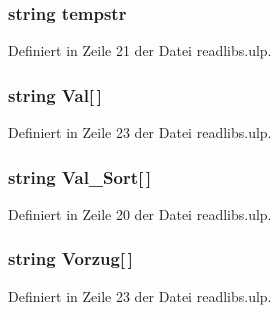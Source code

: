 \subsubsection[{tempstr}]{\setlength{\rightskip}{0pt plus 5cm}string tempstr}\label{readlibs_8ulp_a03ca86bb44d6d953219c512adb218dbb}


Definiert in Zeile 21 der Datei readlibs.\+ulp.

\hypertarget{readlibs_8ulp_a088204f20433deace071409889b5aba1}{}
\subsubsection[{Val}]{\setlength{\rightskip}{0pt plus 5cm}string Val\mbox{[}$\,$\mbox{]}}\label{readlibs_8ulp_a088204f20433deace071409889b5aba1}


Definiert in Zeile 23 der Datei readlibs.\+ulp.

\hypertarget{readlibs_8ulp_a08666752575cacdcfcc8699eb3c95022}{}
\subsubsection[{Val\+\_\+\+Sort}]{\setlength{\rightskip}{0pt plus 5cm}string Val\+\_\+\+Sort\mbox{[}$\,$\mbox{]}}\label{readlibs_8ulp_a08666752575cacdcfcc8699eb3c95022}


Definiert in Zeile 20 der Datei readlibs.\+ulp.

\hypertarget{readlibs_8ulp_a773ea3bd03d30f9371dda8ee12a97b3a}{}
\subsubsection[{Vorzug}]{\setlength{\rightskip}{0pt plus 5cm}string Vorzug\mbox{[}$\,$\mbox{]}}\label{readlibs_8ulp_a773ea3bd03d30f9371dda8ee12a97b3a}


Definiert in Zeile 23 der Datei readlibs.\+ulp.

